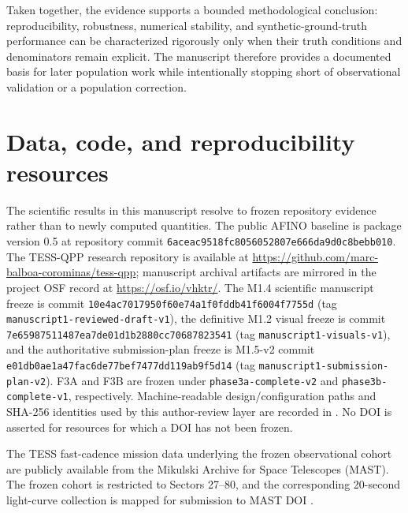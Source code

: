 \documentclass[manuscript,linenumbers]{aastex702}
\begin{document}
Taken together, the evidence supports a bounded methodological conclusion: reproducibility, robustness, numerical stability, and synthetic-ground-truth performance can be characterized rigorously only when their truth conditions and denominators remain explicit. The manuscript therefore provides a documented basis for later population work while intentionally stopping short of observational validation or a population correction.

\section*{Data, code, and reproducibility resources}
\begin{sloppypar}
The scientific results in this manuscript resolve to frozen repository evidence rather than to newly computed quantities. The public AFINO baseline is package version 0.5 at repository commit \texttt{6aceac9518fc8056052807e666da9d0c8bebb010}. The TESS-QPP research repository is available at \url{https://github.com/marc-balboa-corominas/tess-qpp}; manuscript archival artifacts are mirrored in the project OSF record at \url{https://osf.io/vhktr/}. The M1.4 scientific manuscript freeze is commit \texttt{10e4ac7017950f60e74a1f0fddb41f6004f7755d} (tag \texttt{manuscript1-reviewed-draft-v1}), the definitive M1.2 visual freeze is commit \texttt{7e65987511487ea7de01d1b2880cc70687823541} (tag \texttt{manuscript1-visuals-v1}), and the authoritative submission-plan freeze is M1.5-v2 commit \texttt{e01db0ae1a47fac6de77bef7477dd119ab9f5d14} (tag \texttt{manuscript1-submission-plan-v2}). F3A and F3B are frozen under \texttt{phase3a-complete-v2} and \texttt{phase3b-complete-v1}, respectively. Machine-readable design/configuration paths and SHA-256 identities used by this author-review layer are recorded in . No DOI is asserted for resources for which a DOI has not been frozen.
\end{sloppypar}

The TESS fast-cadence mission data underlying the frozen observational cohort are publicly available from the Mikulski Archive for Space Telescopes (MAST). The frozen cohort is restricted to Sectors 27--80, and the corresponding 20-second light-curve collection is mapped for submission to MAST DOI .
\end{document}

